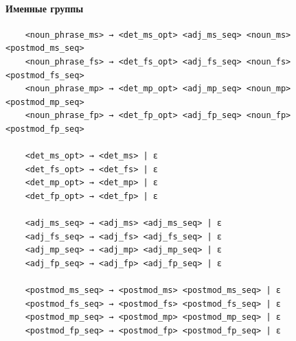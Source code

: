 \documentclass[a4paper,final]{article}
\begin{document}
\paragraph{Именные группы}\mbox{}\par
\begin{lstlisting}
    <noun_phrase_ms> → <det_ms_opt> <adj_ms_seq> <noun_ms> <postmod_ms_seq>
    <noun_phrase_fs> → <det_fs_opt> <adj_fs_seq> <noun_fs> <postmod_fs_seq>
    <noun_phrase_mp> → <det_mp_opt> <adj_mp_seq> <noun_mp> <postmod_mp_seq>
    <noun_phrase_fp> → <det_fp_opt> <adj_fp_seq> <noun_fp> <postmod_fp_seq>
    
    <det_ms_opt> → <det_ms> | ε
    <det_fs_opt> → <det_fs> | ε
    <det_mp_opt> → <det_mp> | ε
    <det_fp_opt> → <det_fp> | ε
    
    <adj_ms_seq> → <adj_ms> <adj_ms_seq> | ε
    <adj_fs_seq> → <adj_fs> <adj_fs_seq> | ε
    <adj_mp_seq> → <adj_mp> <adj_mp_seq> | ε
    <adj_fp_seq> → <adj_fp> <adj_fp_seq> | ε
    
    <postmod_ms_seq> → <postmod_ms> <postmod_ms_seq> | ε
    <postmod_fs_seq> → <postmod_fs> <postmod_fs_seq> | ε
    <postmod_mp_seq> → <postmod_mp> <postmod_mp_seq> | ε
    <postmod_fp_seq> → <postmod_fp> <postmod_fp_seq> | ε
\end{lstlisting}
\end{document}
